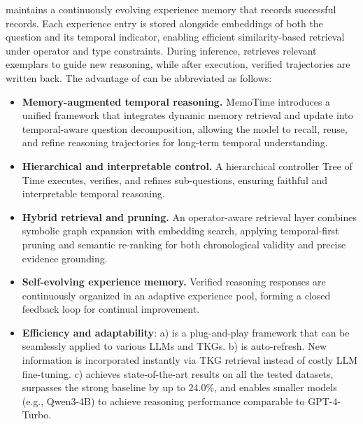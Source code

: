 \mot maintains a continuously evolving experience memory that records successful records.  
Each experience entry is stored alongside embeddings of both the question and its temporal indicator, enabling efficient similarity-based retrieval under operator and type constraints.  
During inference, \mot retrieves relevant exemplars to guide new reasoning, while after execution, verified trajectories are written back. 
The advantage of \mot can be abbreviated as follows:
\begin{itemize}[leftmargin=*]

\item \textbf{Memory-augmented temporal reasoning.} 
MemoTime introduces a unified framework that integrates dynamic memory retrieval and update into temporal-aware question decomposition,  
allowing the model to recall, reuse, and refine reasoning trajectories for long-term temporal understanding.
\item \textbf{Hierarchical and interpretable control.}  
A hierarchical controller Tree of Time executes, verifies, and refines sub-questions, ensuring faithful and interpretable temporal reasoning.

\item \textbf{Hybrid retrieval and pruning.}  
An operator-aware retrieval layer combines symbolic graph expansion with embedding search, applying temporal-first pruning and semantic re-ranking for 
both chronological validity and precise evidence grounding.
\item \textbf{Self-evolving experience memory.}  
Verified reasoning responses are continuously organized in an adaptive experience pool, forming a closed feedback loop for continual improvement.

\item\textbf{Efficiency and adaptability}:  
a) \mot is a plug-and-play framework that can be seamlessly applied to various LLMs and TKGs.
b) \mot is auto-refresh. New information is incorporated instantly via TKG retrieval instead of costly LLM fine-tuning.
c) \mot achieves state-of-the-art results on all the tested datasets, surpasses the strong baseline by up to 24.0\%, and enables smaller models (e.g., Qwen3-4B) to achieve reasoning performance comparable to GPT-4-Turbo.
\end{itemize}

